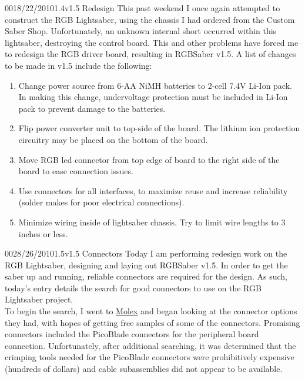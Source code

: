 \documentclass[12pt,letterpaper,onecolumn]{article}
\newcommand{\documentationtype}{Project Notebook}
\newcommand{\projectname}{RGBSaber }
\newcommand{\projectversion}{1}
\begin{document}
\thispagestyle{plain}
\nbwheader{\documentationtype}{\projectname}{\projectversion}

\begin{nbentry}{001}{8/22/2010}{1.4}{v1.5 Redesign}
\indent This past weekend I once again attempted to construct the RGB Lightsaber, using the chassis I had ordered from the Custom Saber Shop. Unfortunately, an unknown internal short occurred within this lightsaber, destroying the control board. This and other problems have forced me to redesign the RGB driver board, resulting in RGBSaber v1.5. A list of changes to be made in v1.5 include the following:
\begin{enumerate}
\item Change power source from 6-AA NiMH batteries to 2-cell 7.4V Li-Ion pack. In making this change, undervoltage protection must be included in Li-Ion pack to prevent damage to the batteries.
\item Flip power converter unit to top-side of the board. The lithium ion protection circuitry may be placed on the bottom of the board.
\item Move RGB led connector from top edge of board to the right side of the board to ease connection issues.
\item Use connectors for all interfaces, to maximize reuse and increase reliability (solder makes for poor electrical connections).
\item Minimize wiring inside of lightsaber chassis. Try to limit wire lengths to 3 inches or less.
\end{enumerate}
\end{nbentry}

\begin{nbentry}{002}{8/26/2010}{1.5}{v1.5 Connectors}
\indent Today I am performing redesign work on the RGB Lightsaber, designing and laying out RGBSaber v1.5. In order to get the saber up and running, reliable connectors are required for the design. As such, today's entry details the search for good connectors to use on the RGB Lightsaber project. \\
\indent To begin the search, I went to \href{http://www.molex.com/}{Molex} and began looking at the connector options they had, with hopes of getting free samples of some of the connectors. Promising connectors included the PicoBlade connectors for the peripheral board connection. Unfortunately, after additional searching, it was determined that the crimping tools needed for the PicoBlade connectors were prohibitively expensive (hundreds of dollars) and cable subassemblies did not appear to be available.
\end{nbentry}
\end{document}
